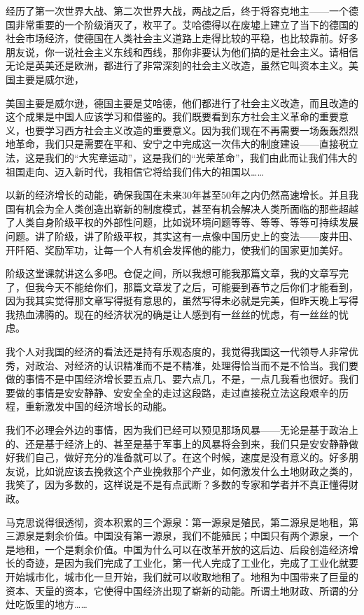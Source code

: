 \documentclass[UTF8, 12pt, a4paper]{ctexrep}
\begin{document}
经历了第一次世界大战、第二次世界大战，两战之后，终于将容克地主——一个德国非常重要的一个阶级消灭了，敉平了。艾哈德得以在废墟上建立了当下的德国的社会市场经济，使德国在人类社会主义道路上走得比较的平稳，也比较靠前。好多朋友说，你一说社会主义东线和西线，那你非要认为他们搞的是社会主义。请相信无论是英美还是欧洲，都进行了非常深刻的社会主义改造，虽然它叫资本主义。美国主要是威尔逊，

美国主要是威尔逊，德国主要是艾哈德，他们都进行了社会主义改造，而且改造的这个成果是中国人应该学习和借鉴的。我们既要看到东方社会主义革命的重要意义，也要学习西方社会主义改造的重要意义。因为我们现在不再需要一场轰轰烈烈地革命，我们只是需要在平和、安宁之中完成这一次伟大的制度建设——直接税立法，这是我们的“大宪章运动”，这是我们的“光荣革命”，我们由此而让我们伟大的祖国走向、迈入新时代，我相信它将给我们伟大的祖国以……

以新的经济增长的动能，确保我国在未来30年甚至50年之内仍然高速增长。并且我国有机会为全人类创造出崭新的制度模式，甚至有机会解决人类所面临的那些超越了人类自身阶级平权的外部性问题，比如说环境问题等等、等等、等等可持续发展问题。讲了阶级，讲了阶级平权，其实这有一点像中国历史上的变法——废井田、开阡陌、奖励军功，让每一个人有机会发挥他的能力，使我们的国家更加美好。

阶级这堂课就讲这么多吧。仓促之间，所以我想可能我那篇文章，我的文章写完了，但我今天不能给你们，那篇文章发了之后，可能要到春节之后你们才能看到，因为我其实觉得那文章写得挺有意思的，虽然写得未必就是完美，但昨天晚上写得我热血沸腾的。现在的经济状况的确是让人感到有一丝丝的忧虑，有一丝丝的忧虑。

我个人对我国的经济的看法还是持有乐观态度的，我觉得我国这一代领导人非常优秀，对政治、对经济的认识精准而不是不精准，处理得恰当而不是不恰当。我们要做的事情不是中国经济增长要五点几、要六点几，不是，一点几我看也很好。我们要做的事情是安安静静、安安全全的走过这段路，走过直接税立法这段艰辛的历程，重新激发中国的经济增长的动能。

我们不必理会外边的事情，因为我们已经可以预见那场风暴——无论是基于政治上的、还是基于经济上的、甚至是基于军事上的风暴将会到来，我们只是安安静静做好我们自己，做好充分的准备就可以了。在这个时候，速度是没有意义的。好多朋友说，比如说应该去挽救这个产业挽救那个产业，如何激发什么土地财政之类的，我笑了，因为多数的，这样说是不是有点武断？多数的专家和学者并不真正懂得财政。

马克思说得很透彻，资本积累的三个源泉：第一源泉是殖民，第二源泉是地租，第三源泉是剩余价值。中国没有第一源泉，我们不能殖民；中国只有两个源泉，一个是地租，一个是剩余价值。中国为什么可以在改革开放的这后边、后段创造经济增长的奇迹，是因为我们完成了工业化，第一代人完成了工业化，完成了工业化就要开始城市化，城市化一旦开始，我们就可以收取地租了。地租为中国带来了巨量的资本、天量的资本，它使得中国经济出现了崭新的动能。所谓土地财政、所谓的分灶吃饭里的地方……
\end{document}
